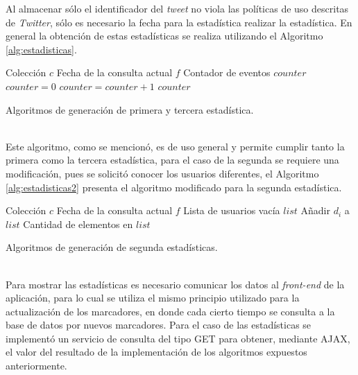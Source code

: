 Al almacenar sólo el identificador del \textit{tweet} no viola las políticas de uso descritas de \textit{Twitter}, sólo es necesario la fecha para la estadística realizar la estadística. En general la obtención de estas estadísticas se realiza utilizando el Algoritmo \ref{alg:estadisticas}.\\

\begin{algorithm}[H]
	\begin{algorithmic}
		\REQUIRE Colección $c$ 
		\REQUIRE Fecha de la consulta actual $f$ 
		\ENSURE Contador de eventos $counter$  
		\STATE $counter = 0$
				\STATE $counter = counter + 1$
			\ENDIF	
		\ENDFOR
		\RETURN $counter$
	\end{algorithmic}
	\caption{Algoritmos de generación de primera y tercera estadística.}
	\label{alg:estadisticas}
\end{algorithm}\vphantom\\

Este algoritmo, como se mencionó, es de uso general y permite cumplir tanto la primera como la tercera estadística, para el caso de la segunda se requiere una modificación, pues se solicitó conocer los usuarios diferentes, el Algoritmo \ref{alg:estadisticas2} presenta el algoritmo modificado para la segunda estadística.\\

\begin{algorithm}[H]
	\begin{algorithmic}
		\REQUIRE Colección $c$ 
		\REQUIRE Fecha de la consulta actual $f$ 
		\ENSURE Lista de usuarios vacía $list$  
					\STATE Añadir $d_{i}$ a $list$
				\ENDIF
			\ENDIF	
		\ENDFOR
		\RETURN Cantidad de elementos en $list$
	\end{algorithmic}
	\caption{Algoritmos de generación de segunda estadísticas.}
	\label{alg:estadisticas2}
\end{algorithm}\vphantom\\

Para mostrar las estadísticas es necesario comunicar los datos al \textit{front-end} de la aplicación, para lo cual se utiliza el mismo principio utilizado para la actualización de los marcadores, en donde cada cierto tiempo se consulta a la base de datos por nuevos marcadores. Para el caso de las estadísticas se implementó un servicio de consulta del tipo GET para obtener, mediante AJAX, el valor del resultado de la implementación de los algoritmos expuestos anteriormente.

